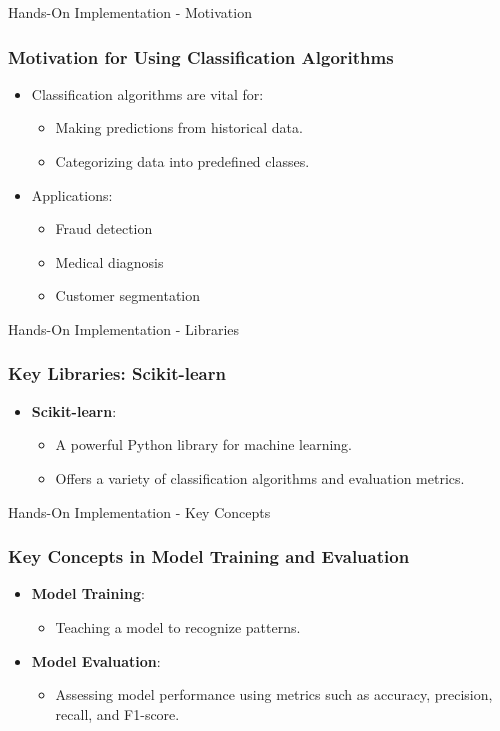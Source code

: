 \documentclass[aspectratio=169]{beamer}
\begin{document}
\begin{frame}{Hands-On Implementation - Motivation}
    \frametitle{Motivation for Using Classification Algorithms}
    \begin{itemize}
        \item Classification algorithms are vital for:
        \begin{itemize}
            \item Making predictions from historical data.
            \item Categorizing data into predefined classes.
        \end{itemize}
        \item Applications:
        \begin{itemize}
            \item Fraud detection
            \item Medical diagnosis
            \item Customer segmentation
        \end{itemize}
    \end{itemize}
\end{frame}

\begin{frame}{Hands-On Implementation - Libraries}
    \frametitle{Key Libraries: Scikit-learn}
    \begin{itemize}
        \item \textbf{Scikit-learn}:
        \begin{itemize}
            \item A powerful Python library for machine learning.
            \item Offers a variety of classification algorithms and evaluation metrics.
        \end{itemize}
    \end{itemize}
\end{frame}

\begin{frame}{Hands-On Implementation - Key Concepts}
    \frametitle{Key Concepts in Model Training and Evaluation}
    \begin{itemize}
        \item \textbf{Model Training}:
        \begin{itemize}
            \item Teaching a model to recognize patterns.
        \end{itemize}
        \item \textbf{Model Evaluation}:
        \begin{itemize}
            \item Assessing model performance using metrics such as accuracy, precision, recall, and F1-score.
        \end{itemize}
    \end{itemize}
\end{frame}
\end{document}
